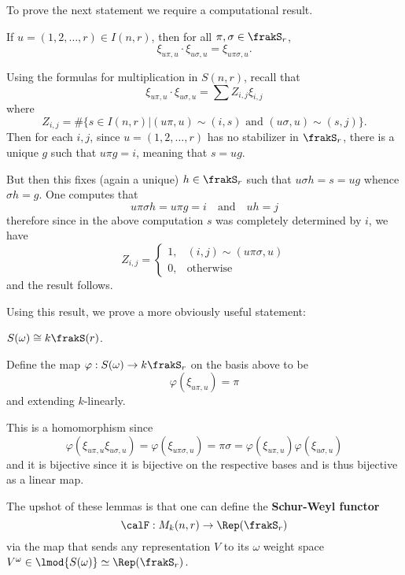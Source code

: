 \documentclass[12pt]{article}
\begin{document}
To prove the next statement we require a computational result.
\begin{lem}\label{lem:somega-mult}
	If $u=(1,2,\dots,r)\in I(n,r)$, then for all $\pi,\sigma\in\frakS_r$,
	\[\xi_{u\pi,u}\cdot \xi_{u\sigma,u}=\xi_{u\pi\sigma,u}.\]
\end{lem}
\begin{prf}
	Using the formulas for multiplication in $S(n,r)$, recall that 
	\begin{equation}
		\xi_{u\pi,u}\cdot\xi_{u\sigma,u}=\sum Z_{i,j} \xi_{i,j}\label{eq:1}
	\end{equation}
	where 
	\[Z_{i,j}=\#\{s\in I(n,r)|(u\pi,u)\sim(i,s)\text{ and }(u\sigma,u)\sim (s,j)\}.\]
	Then for each $i,j$, since $u=(1,2,\dots,r)$ has no stabilizer in $\frakS_r$, there is a unique 
	$g$ such that $u\pi g=i$, meaning that $s=ug$. 

	But then this fixes (again a unique) $h\in\frakS_r$ such that $u\sigma h=s=u g$ whence $\sigma h= g$. 
	One computes that 
	\[u\pi\sigma h = u\pi g=i\quad\text{and}\quad uh = j\]
	therefore since in the above computation $s$ was completely determined by $i$, we have
	\[Z_{i,j}=\left\{\begin{array}{lr}
		1, &  (i,j)\sim(u\pi\sigma,u)\\
		0, & \text{otherwise}
	\end{array}\right.\]
	and the result follows.
\end{prf}
Using this result, we prove a more obviously useful statement:

\begin{lem}
	$S(\omega)\cong k\frakS(r)$.
\end{lem}
\begin{prf}
	Define the map $\varphi:S(\omega)\to k\frakS_r$ on the basis above to be 
	\[\varphi (\xi_{u\pi,u})=\pi\]
	and extending $k$-linearly.

	This is a homomorphism since 
	\[\varphi(\xi_{u\pi,u}\xi_{u\sigma,u})=\varphi(\xi_{u\pi\sigma,u})=\pi\sigma=\varphi(\xi_{u\pi,u})\varphi(\xi_{u\sigma,u})\]
	and it is bijective since it is bijective on the respective bases and is thus bijective as a linear map.
\end{prf}
The upshot of these lemmas is that one can define the \textbf{Schur-Weyl functor} 
\[\calF:M_k(n,r)\to \Rep(\frakS_r)\]
via the map that sends any representation $V$ to its $\omega$ weight space $V^\omega\in \lmod {S(\omega)}\simeq \Rep(\frakS_r)$.
\end{document}
